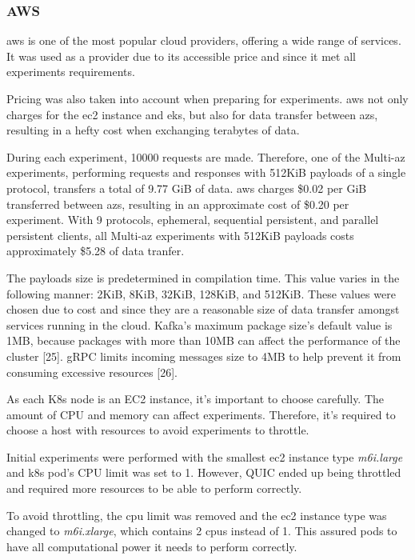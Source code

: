 \subsubsection{AWS}

\gls{aws} is one of the most popular cloud providers, offering a wide range of services. It was used as a provider due to its accessible price and since it met all experiments requirements.

Pricing was also taken into account when preparing for experiments. \gls{aws} not only charges for the \gls{ec2} instance and \gls{eks}, but also for data transfer between \gls{az}s, resulting in a hefty cost when exchanging terabytes of data.

During each experiment, 10000 requests are made. Therefore, one of the Multi-\gls{az} experiments, performing requests and responses with 512KiB payloads of a single protocol, transfers a total of 9.77 GiB of data. \gls{aws} charges \$0.02 per GiB transferred between \gls{az}s, resulting in an approximate cost of \$0.20 per experiment. With 9 protocols, ephemeral, sequential persistent, and parallel persistent clients, all Multi-\gls{az} experiments with 512KiB payloads costs approximately \$5.28 of data tranfer.

The payloads size is predetermined in compilation time. This value varies in the following manner: 2KiB, 8KiB, 32KiB, 128KiB, and 512KiB. These values were chosen due to cost and since they are a reasonable size of data transfer amongst services running in the cloud. Kafka's maximum package size’s default value is 1MB, because packages with more than 10MB can affect the performance of the cluster [25]. gRPC limits incoming messages size to 4MB to help prevent it from consuming excessive resources [26].

As each K8s node is an EC2 instance, it's important to choose carefully. The amount of CPU and memory can affect experiments. Therefore, it's required to choose a host with resources to avoid experiments to throttle.

Initial experiments were performed with the smallest \gls{ec2} instance type \textit{m6i.large} and \gls{k8s} pod's CPU limit was set to 1. However, QUIC ended up being throttled and required more resources to be able to perform correctly.

To avoid throttling, the \gls{cpu} limit was removed and the \gls{ec2} instance type was changed to \textit{m6i.xlarge}, which contains 2 \gls{cpu}s instead of 1. This assured pods to have all computational power it needs to perform correctly.

